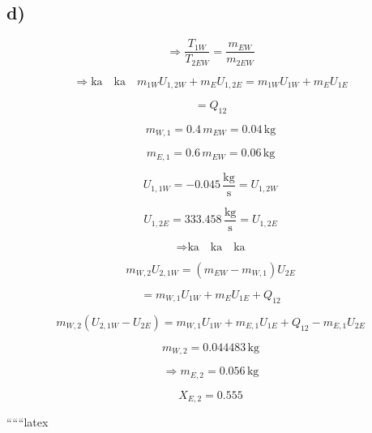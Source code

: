

\subsection*{d)}

\[
\Rightarrow \frac{T_{1W}}{T_{2EW}} = \frac{m_{EW}}{m_{2EW}}
\]

\[
\Rightarrow \text{ka} \quad \text{ka} \quad m_{1W} U_{1,2W} + m_{E} U_{1,2E} = m_{1W} U_{1W} + m_{E} U_{1E}
\]

\[
= Q_{12}
\]

\[
m_{W,1} = 0.4 \, m_{EW} = 0.04 \, \text{kg}
\]

\[
m_{E,1} = 0.6 \, m_{EW} = 0.06 \, \text{kg}
\]

\[
U_{1,1W} = -0.045 \, \frac{\text{kg}}{\text{s}} = U_{1,2W}
\]

\[
U_{1,2E} = 333.458 \, \frac{\text{kg}}{\text{s}} = U_{1,2E}
\]

\[
\Rightarrow \text{ka} \quad \text{ka} \quad \text{ka}
\]

\[
m_{W,2} U_{2,1W} = (m_{EW} - m_{W,1}) U_{2E}
\]

\[
= m_{W,1} U_{1W} + m_{E} U_{1E} + Q_{12}
\]

\[
m_{W,2} (U_{2,1W} - U_{2E}) = m_{W,1} U_{1W} + m_{E,1} U_{1E} + Q_{12} - m_{E,1} U_{2E}
\]

\[
m_{W,2} = 0.044483 \, \text{kg}
\]

\[
\Rightarrow m_{E,2} = 0.056 \, \text{kg}
\]

\[
X_{E,2} = 0.555
\]

``````latex